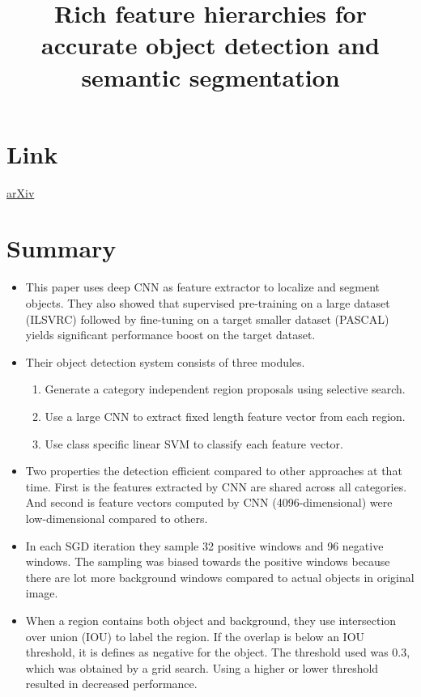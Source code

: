 \documentclass{article}
\title{Rich feature hierarchies for accurate object detection and semantic segmentation}
\author{}
\date{}
\begin{document}
\maketitle

\section*{Link}
\href{https://arxiv.org/abs/1311.2524}{arXiv} 

\section*{Summary}
\begin{itemize}
    \item This paper uses deep CNN as feature extractor to localize and segment objects. They also showed that supervised pre-training on a large dataset (ILSVRC) followed by fine-tuning on a target smaller dataset (PASCAL) yields significant performance boost on the target dataset. 
    \item Their object detection system consists of three modules.
    \begin{enumerate}
        \item Generate a category independent region proposals using selective search.
        \item Use a large CNN to extract fixed length feature vector from each region.
        \item Use class specific linear SVM to classify each feature vector.
    \end{enumerate}
    \item Two properties the detection efficient compared to other approaches at that time. First is the features extracted by CNN are shared across all categories. And second is feature vectors computed by CNN (4096-dimensional) were low-dimensional compared to others.
    \item In each SGD iteration they sample 32 positive windows and 96 negative windows. The sampling was biased towards the positive windows because there are lot more background windows compared to actual objects in original image.
    \item When a region contains both object and background, they use intersection over union (IOU) to label the region. If the overlap is below an IOU threshold, it is defines as negative for the object. The threshold used was 0.3, which was obtained by a grid search. Using a higher or lower threshold resulted in decreased performance.

\end{itemize}
\end{document}
